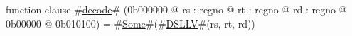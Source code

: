 function clause #\hyperref[zdecode]{decode}# (0b000000 @ rs : regno @ rt : regno @ rd : regno @ 0b00000 @ 0b010100) =
  #\hyperref[zSome]{Some}#(#\hyperref[zDSLLV]{DSLLV}#(rs, rt, rd))
